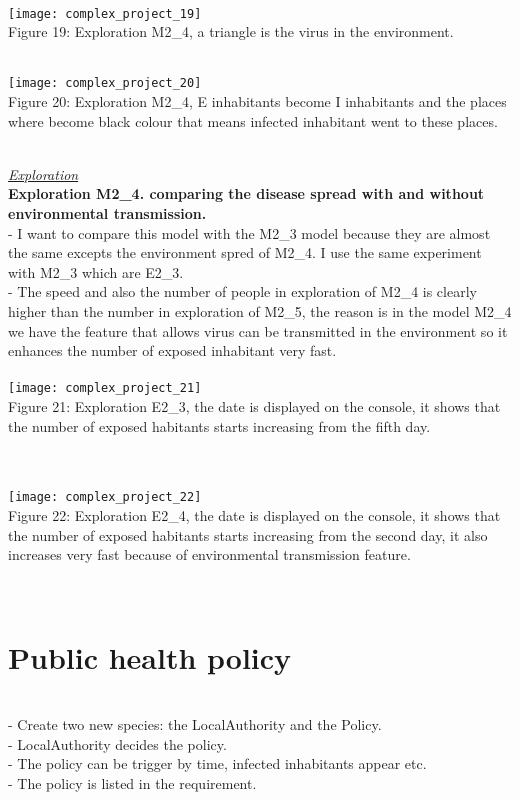 \documentclass{article}
\begin{document}
\\
\texttt{[image: complex\_project\_19]}
\\
\caption{Figure 19: Exploration M2\_4, a triangle is the virus in the environment.} 
\\
\texttt{[image: complex\_project\_20]}
\\
\caption{Figure 20: Exploration M2\_4, E inhabitants become I inhabitants and the places where become black colour that means infected inhabitant went to these places.} 
\\
\underline{\emph{Exploration}}
\\\textbf{Exploration M2\_4. comparing the disease spread with and without environmental transmission.}
\\- I want to compare this model with the M2\_3 model because they are almost the same excepts the environment spred of M2\_4. I use the same experiment with M2\_3 which are E2\_3.
\\- The speed and also the number of people in exploration of M2\_4 is clearly higher than the number in exploration of M2\_5, the reason is in the model M2\_4 we have the feature that allows virus can be transmitted in the environment so it enhances the number of exposed inhabitant very fast.
\\\\
\texttt{[image: complex\_project\_21]}
\\
\caption{Figure 21: Exploration E2\_3, the date is displayed on the console, it shows that the number of exposed habitants starts increasing from the fifth day.} 
\\\\
\texttt{[image: complex\_project\_22]}
\\
\caption{Figure 22: Exploration E2\_4, the date is displayed on the console, it shows that the number of exposed habitants starts increasing from the second day, it also increases very fast because of environmental transmission feature.} 
\\
\section{Public health policy}
\\- Create two new species: the LocalAuthority and the Policy.
\\- LocalAuthority decides the policy.
\\- The policy can be trigger by time, infected inhabitants appear etc.
\\- The policy is listed in the requirement.
\end{document}

